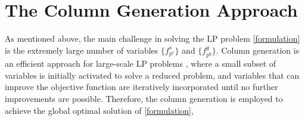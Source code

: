 \documentclass[journal,10pt]{IEEEtran}
\begin{document}
\section{The Column Generation Approach}
\label{proposed_method}

As mentioned above, the main challenge in solving the LP problem \eqref{formulation} is the extremely large number of variables $\{f^s_{p^s}\}$ and $\{f^g_{p^g}\}$. Column generation is an efficient approach for large-scale LP problems \cite{lubbecke2005selected}, where a small subset of variables is initially activated to solve a reduced problem, and variables that can improve the objective function are iteratively incorporated until no further improvements are possible. Therefore, the column generation is employed to achieve the global optimal solution of \eqref{formulation}, 
\end{document}
